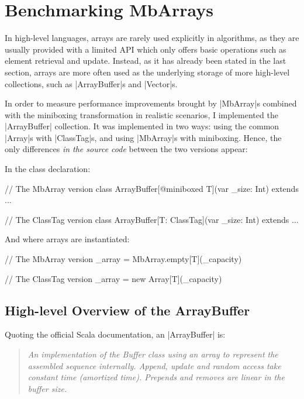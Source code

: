 \section{Benchmarking MbArrays}
\label{sec:bench}

In high-level languages, arrays are rarely used explicitly in algorithms, as they are usually provided with a limited API which only offers basic operations such as element retrieval and update. Instead, as it has already been stated in the last section, arrays are more often used as the underlying storage of more high-level collections, such as |ArrayBuffer|s and |Vector|s.

In order to measure performance improvements brought by |MbArray|s combined with the miniboxing transformation in realistic scenarios, I implemented the |ArrayBuffer| collection. It was implemented in two ways: using the common |Array|s with |ClassTag|s, and using |MbArray|s with miniboxing.
Hence, the only differences \emph{in the source code} between the two versions appear:

In the class declaration: %
  
\begin{lstlisting-nobreak}
// The MbArray version
class ArrayBuffer[@miniboxed T](var _size: Int) 
	extends ...

// The ClassTag version
class ArrayBuffer[T: ClassTag](var _size: Int)   
	extends ...
\end{lstlisting-nobreak}

And where arrays are instantiated:

\begin{lstlisting-nobreak}
// The MbArray version
	_array = MbArray.empty[T](_capacity)

// The ClassTag version
	_array = new Array[T](_capacity)
\end{lstlisting-nobreak}

\subsection{High-level Overview of the ArrayBuffer}

Quoting the official Scala documentation, an |ArrayBuffer| is: 
\begin{quote}
\textit{An implementation of the Buffer class using an array to represent the assembled sequence internally. Append, update and random access take constant time (amortized time). Prepends and removes are linear in the buffer size.} 
\end{quote}

